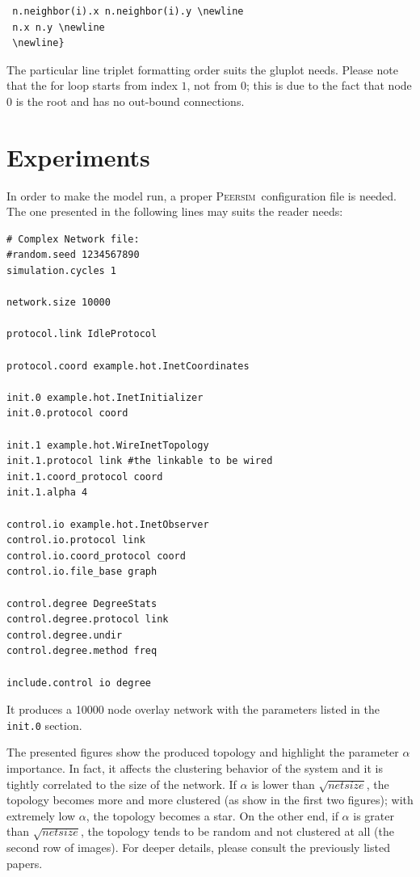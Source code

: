 \documentclass[a4paper,12pt]{article}
\newcommand{\id}[1]{{\scshape\small #1}}
\newcommand{\psim}{\id{Peersim}}
\begin{document}
\footnotesize
\begin{verbatim}
 n.neighbor(i).x n.neighbor(i).y \newline
 n.x n.y \newline
 \newline}
\end{verbatim}
\normalsize 

The particular line triplet formatting order suits the gluplot needs. 
Please note that the for loop starts from index $1$, not from $0$;
this is due to the fact that node 0 is the root and has no out-bound
connections.

\section{Experiments}
\label{s:experiments}

In order to make the model run, a proper \psim~configuration file is 
needed. The one presented in the following lines may suits the reader needs:

\footnotesize
\begin{verbatim}
# Complex Network file:
#random.seed 1234567890
simulation.cycles 1

network.size 10000

protocol.link IdleProtocol

protocol.coord example.hot.InetCoordinates

init.0 example.hot.InetInitializer
init.0.protocol coord

init.1 example.hot.WireInetTopology
init.1.protocol link #the linkable to be wired
init.1.coord_protocol coord
init.1.alpha 4

control.io example.hot.InetObserver
control.io.protocol link
control.io.coord_protocol coord
control.io.file_base graph

control.degree DegreeStats
control.degree.protocol link
control.degree.undir
control.degree.method freq

include.control io degree
\end{verbatim}
\normalsize

It produces a 10000 node overlay network with the parameters listed in 
the \texttt{init.0} section.

The presented figures show the produced topology and highlight the 
parameter $\alpha$ importance. In fact, it affects the clustering behavior of 
the system and it is tightly correlated to the size of the network. If 
$\alpha$ is lower than $\sqrt{netsize}$, the topology becomes more and more 
clustered (as show in the first two figures); with extremely low $\alpha$, 
the topology becomes a star. On the other end, if $\alpha$ is grater than 
$\sqrt{netsize}$, the topology tends to be random and not clustered at all 
(the second row of images). For deeper details, please consult the previously
listed papers.
\end{document}
